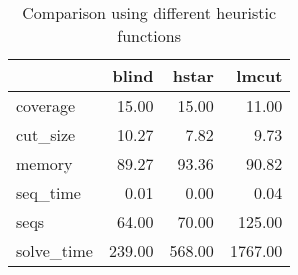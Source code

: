 \begin{table}[htbp]
\centering
\begingroup\small
\begin{tabular}{lrrr}
  \hline
 & blind & hstar & lmcut \\ 
  \hline
coverage & 15.00 & 15.00 & 11.00 \\ 
  cut\_size & 10.27 & 7.82 & 9.73 \\ 
  memory & 89.27 & 93.36 & 90.82 \\ 
  seq\_time & 0.01 & 0.00 & 0.04 \\ 
  seqs & 64.00 & 70.00 & 125.00 \\ 
  solve\_time & 239.00 & 568.00 & 1767.00 \\ 
   \hline
\end{tabular}
\endgroup
\caption{Comparison using different heuristic functions} 
\label{tab:summary_heuristics}
\end{table}
